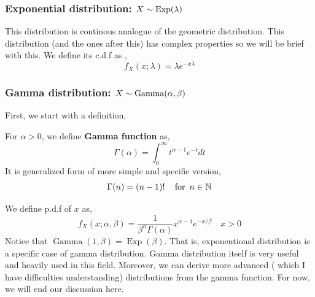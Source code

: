 \subsubsection*{Exponential distribution: $X \sim \operatorname{Exp}(\lambda)$}
This distribution is continous analogue of the geometric distribution. This distribution (and the ones after this) has complex properties so we will be brief with this.
We define its c.d.f as ,
\[f_X(x; \lambda) = \lambda e^{-x \lambda}\]
\subsubsection*{Gamma distribution: $X \sim \operatorname{Gamma} (\alpha, \beta)$}
First, we start with a definition,
\begin{definition}
    For $\alpha > 0$, we define \textbf{Gamma function} as,
    \[\Gamma(\alpha) = \int_{0}^{\infty} t^{\alpha-1} e^{-t}dt\]
    It is generalized form of more simple and specific version, 
    \[ \Gamma(n) = (n-1)! \quad \operatorname{for} \ n \in \mathbb{N} \]
\end{definition}
    We define p.d.f of $x$ as,
    \[f_X(x; \alpha, \beta) =  \frac{1}{\beta^{\alpha} \Gamma(\alpha)} x^{\alpha-1} e^{-x/ \beta} \quad x > 0\]
    Notice that $ \operatorname{Gamma}(1, \beta) =\operatorname{Exp}( \beta)$. That is, exponentional distribution is a specific case of gamma distribution.
    Gamma distribution itself is very useful and heavily used in this field. Moreover, we can derive more advanced ( which I have difficulties understanding) distributions from the gamma function. For now, we will end our discussion here.

